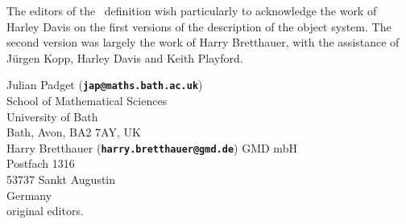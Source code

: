 \begin{foreword}
\begin{optDefinition}
The editors of the \eulisp\ definition wish particularly to acknowledge the work
of Harley Davis on the first versions of the description of the object system.
The second version was largely the work of Harry Bretthauer, with the assistance
of J\"urgen Kopp, Harley Davis and Keith Playford.

Julian Padget ({\bf \tt jap@maths.bath.ac.uk})\\
School of Mathematical Sciences\\
University of Bath\\
Bath, Avon, BA2 7AY, UK\\

\noindent
Harry Bretthauer ({\bf \tt harry.bretthauer@gmd.de})
GMD mbH\\
Postfach 1316\\
53737 Sankt Augustin\\
Germany\\

\noindent
original editors.
\end{optDefinition}
\end{foreword}
